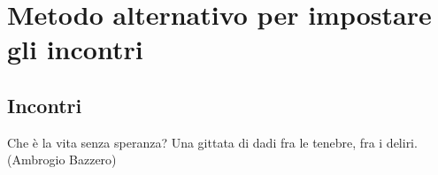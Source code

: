 \documentclass[a4paper,twoside,openany]{book}
\begin{document}
\pagebreak

\section{Metodo alternativo per impostare gli incontri}

\subsection{Incontri}

\label{incontri}

\begin{changemargin}{0.3cm}{0.3cm}\begin{enfasi}{Che è la vita senza speranza? Una gittata di dadi fra le tenebre, fra i deliri. (Ambrogio Bazzero)}
\end{enfasi}\end{changemargin}
\end{document}
